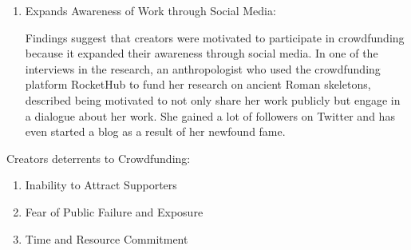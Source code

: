 \begin{enumerate}
      \item Expands Awareness  of Work  through Social Media:
      
            Findings suggest that creators were motivated to
            participate in crowdfunding because it expanded their awareness through social media. In one of the
            interviews in the research, an anthropologist who used the crowdfunding platform RocketHub to fund
            her research on ancient Roman skeletons, described being motivated to not only share her work publicly but engage in a dialogue about her work. She gained a lot of followers on Twitter and has even
            started a blog as a result of her newfound fame.

\end{enumerate}

Creators deterrents to Crowdfunding:
\begin{enumerate}
      \item Inability to Attract Supporters
      \item Fear of Public Failure and Exposure
      \item Time and Resource Commitment
\end{enumerate}

